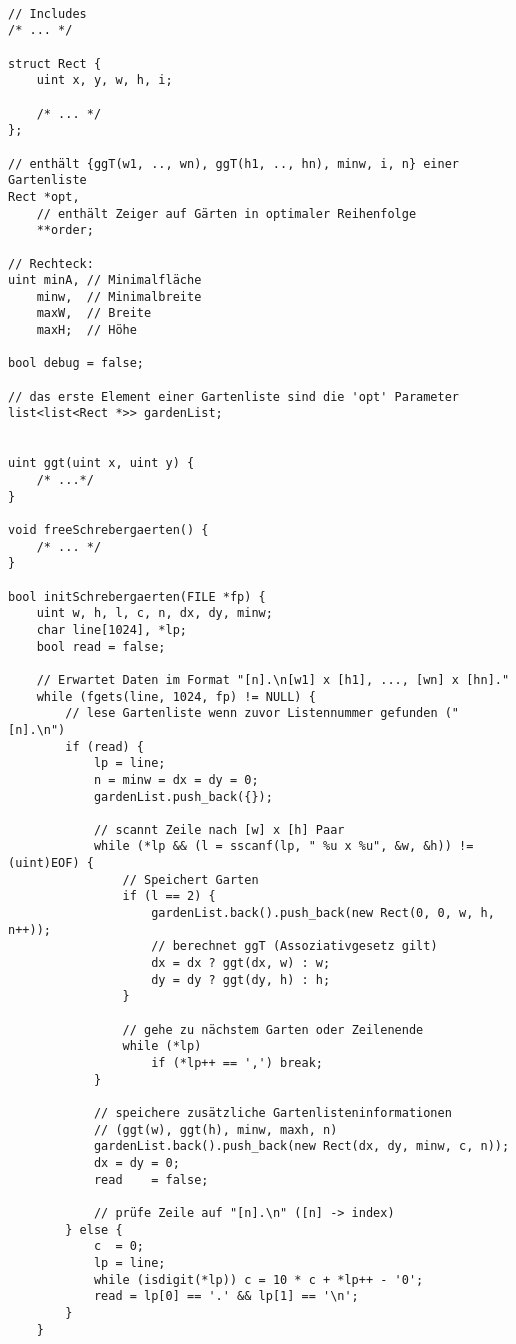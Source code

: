 \documentclass[a4paper,10pt,ngerman]{scrartcl}
\begin{document}
\begin{lstlisting}[frame=single]

// Includes
/* ... */

struct Rect {
    uint x, y, w, h, i;

    /* ... */
};

// enthält {ggT(w1, .., wn), ggT(h1, .., hn), minw, i, n} einer Gartenliste
Rect *opt,
    // enthält Zeiger auf Gärten in optimaler Reihenfolge
    **order;

// Rechteck:
uint minA, // Minimalfläche
    minw,  // Minimalbreite
    maxW,  // Breite
    maxH;  // Höhe

bool debug = false;

// das erste Element einer Gartenliste sind die 'opt' Parameter
list<list<Rect *>> gardenList;


uint ggt(uint x, uint y) {
    /* ...*/
}

void freeSchrebergaerten() {
    /* ... */
}

bool initSchrebergaerten(FILE *fp) {
    uint w, h, l, c, n, dx, dy, minw;
    char line[1024], *lp;
    bool read = false;

    // Erwartet Daten im Format "[n].\n[w1] x [h1], ..., [wn] x [hn]."
    while (fgets(line, 1024, fp) != NULL) {
        // lese Gartenliste wenn zuvor Listennummer gefunden ("[n].\n")
        if (read) {
            lp = line;
            n = minw = dx = dy = 0;
            gardenList.push_back({});

            // scannt Zeile nach [w] x [h] Paar
            while (*lp && (l = sscanf(lp, " %u x %u", &w, &h)) != (uint)EOF) {
                // Speichert Garten
                if (l == 2) {
                    gardenList.back().push_back(new Rect(0, 0, w, h, n++));
                    // berechnet ggT (Assoziativgesetz gilt)
                    dx = dx ? ggt(dx, w) : w;
                    dy = dy ? ggt(dy, h) : h;
                }

                // gehe zu nächstem Garten oder Zeilenende
                while (*lp)
                    if (*lp++ == ',') break;
            }

            // speichere zusätzliche Gartenlisteninformationen
            // (ggt(w), ggt(h), minw, maxh, n)
            gardenList.back().push_back(new Rect(dx, dy, minw, c, n));
            dx = dy = 0;
            read    = false;

            // prüfe Zeile auf "[n].\n" ([n] -> index)
        } else {
            c  = 0;
            lp = line;
            while (isdigit(*lp)) c = 10 * c + *lp++ - '0';
            read = lp[0] == '.' && lp[1] == '\n';
        }
    }


\end{lstlisting}
\end{document}
